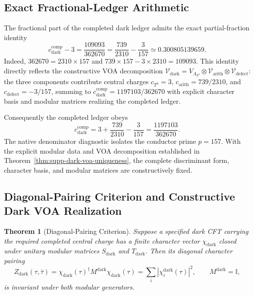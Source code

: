 \documentclass[11pt]{article}
\theoremstyle{plain}
\newtheorem{theorem}{Theorem}
\newcommand{\cdarkcomp}{c_{\text{dark}}^{\text{comp}}}
\begin{document}
\subsection{Exact Fractional-Ledger Arithmetic}

The fractional part of the completed dark ledger admits the exact
partial-fraction identity
\begin{equation}
\label{eq:dark-fractional-ledger}
 \cdarkcomp-3
 =\frac{109093}{362670}
 =\frac{739}{2310}-\frac{3}{157}
 \simeq0.300805139659.
\end{equation}
Indeed, \(362670=2310\times157\) and
\(739\times157-3\times2310=109093\). This identity directly reflects
the constructive VOA decomposition $\mathcal{V}_{\text{dark}} = V_{\Lambda_{T^3}} \otimes \mathcal{V}_{\text{arith}} \otimes \mathcal{V}_{\text{defect}}$:
the three components contribute central charges $c_{T^3} = 3$, $c_{\text{arith}} = 739/2310$, and $c_{\text{defect}} = -3/157$, summing to $c_{\text{dark}}^{\text{comp}} = 1197103/362670$ with explicit character basis and modular matrices realizing the completed ledger.

Consequently the completed ledger obeys
\begin{equation}
\label{eq:dark-completed-partial-fraction}
 \cdarkcomp=3+\frac{739}{2310}-\frac{3}{157}
 =\frac{1197103}{362670}.
\end{equation}
The native denominator diagnostic isolates the conductor prime $p = 157$. With the explicit modular data and VOA decomposition established in Theorem~\ref{thm:supp-dark-voa-uniqueness}, the complete discriminant form, character basis, and modular matrices are constructively fixed.

\subsection{Diagonal-Pairing Criterion and Constructive Dark VOA Realization}

\begin{theorem}[Diagonal-Pairing Criterion]
Suppose a specified dark CFT carrying the required completed central charge
has a finite character vector \(\chi_{\text{dark}}\) closed under unitary
modular matrices \(S_{\text{dark}}\) and \(T_{\text{dark}}\).  Then its
diagonal character pairing
\begin{equation}
\label{eq:dark-diagonal-partition-criterion}
 Z_{\text{dark}}(\tau,\bar\tau)
 =\chi_{\text{dark}}(\tau)^\dagger
 M^{\text{dark}}\chi_{\text{dark}}(\tau)
 =\sum_i|\chi_i^{\text{dark}}(\tau)|^2,
 \qquad M^{\text{dark}}=\mathbb I,
\end{equation}
is invariant under both modular generators.
\end{theorem}
\end{document}
